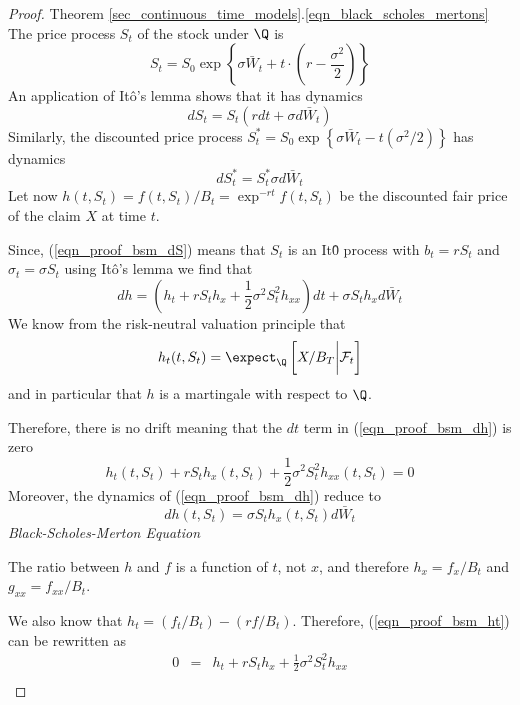 \documentclass[11pt,a4paper]{article}
\begin{document}
  \begin{proof}{Theorem \ref{sec_continuous_time_models}.\ref{eqn_black_scholes_mertons}}
    The price process $S_t$ of the stock under $\Q$ is
    \[ S_t=S_0\exp\left\{\sigma\bar{W}_t+t\cdot\left(r-\frac{\sigma^2}2\right)\right\} \]
    An application of It\^o's lemma shows that it has dynamics
    \begin{equation}\label{eqn_proof_bsm_dS}
      dS_t=S_t(rdt+\sigma d\bar{W}_t)
    \end{equation}
    Similarly, the discounted price process $S_t^*=S_0\exp\left\{\sigma\bar{W}_t-t(\sigma^2/2)\right\}$ has dynamics
    \begin{equation}\label{eqn_proof_bsm_dSt_star}
      dS_t^*=S_t^*\sigma d\bar{W}_t
    \end{equation}
    Let now $h(t,S_t)=f(t,S_t)/B_t=\exp^{-rt}f(t,S_t)$ be the discounted fair price of the claim $X$ at time $t$.
    \par Since, (\ref{eqn_proof_bsm_dS}) means that $S_t$ is an It\^0 process with $b_t=rS_t$ and $\sigma_t=\sigma S_t$ using It\^o's lemma we find that
    \begin{equation}\label{eqn_proof_bsm_dh}
      dh=\left(h_t+rS_th_x+\frac12\sigma^2S_t^2h_{xx}\right)dt+\sigma S_th_xd\bar{W}_t
    \end{equation}
    We know from the risk-neutral valuation principle that
    \begin{equation}\label{eqn_proof_bsm_ht}
      h_t(t,S_t)=\expect_\Q\left[X/B_T\bigg|\mathcal{F}_t\right]
    \end{equation}
    and in particular that $h$ is a martingale with respect to $\Q$.
    \par Therefore, there is no drift meaning that the $dt$ term in (\ref{eqn_proof_bsm_dh}) is zero
    \[ h_t(t,S_t)+rS_th_x(t,S_t)+\frac12\sigma^2S_t^2h_{xx}(t,S_t)=0 \]
    Moreover, the dynamics of (\ref{eqn_proof_bsm_dh}) reduce to
    \begin{equation}\label{eqn_proof_bsm_dh_2}
      dh(t,S_t)=\sigma S_th_x(t,S_t)d\bar{W}_t
    \end{equation}
    \textit{Black-Scholes-Merton Equation}
    \par The ratio between $h$ and $f$ is a function of $t$, not $x$, and therefore $h_x=f_x/B_t$ and $g_{xx}=f_{xx}/B_t$.
    \par We also know that $h_t=(f_t/B_t)-(rf/B_t)$. Therefore, (\ref{eqn_proof_bsm_ht}) can be rewritten as
    \[\begin{array}{rcl}
      0&=&h_t+rS_th_x+\frac12\sigma^2S_t^2h_{xx}\\

\end{array}\]
\end{proof}
\end{document}
